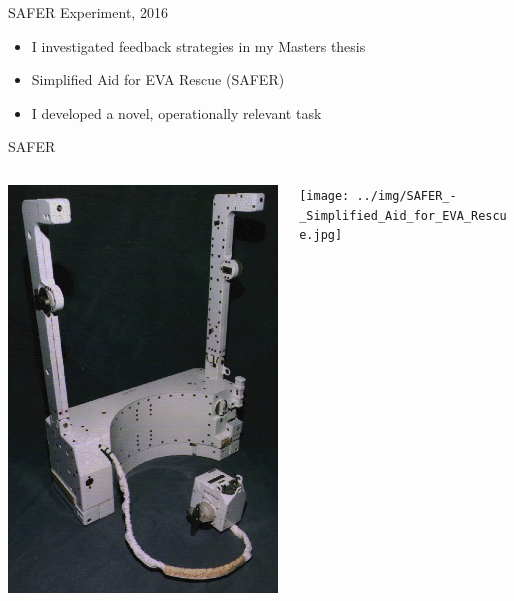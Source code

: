 \documentclass[10pt]{beamer}
\begin{document}
\begin{frame}[fragile]{SAFER Experiment, 2016~\cite{Karasinski2016Masters}}
  \begin{itemize}
    \setlength\itemsep{1em}
    \item I investigated feedback strategies in my Masters thesis
    \item Simplified Aid for EVA Rescue (SAFER)
    \item I developed a novel, operationally relevant task
  \end{itemize}
\end{frame}

\begin{frame}[fragile]{SAFER}
  \begin{columns}[T]
    \begin{column}{.5\textwidth}
      \hfill
      \includegraphics[height=1.3\textwidth]{../img/SAFER_-_Simplified_Aid_for_EVA_Rescue_2.jpg}
    \end{column}%
    \begin{column}{.5\textwidth}
      \texttt{[image: ../img/SAFER\_-\_Simplified\_Aid\_for\_EVA\_Rescue.jpg]}
    \end{column}
  \end{columns}
\end{frame}
\end{document}
